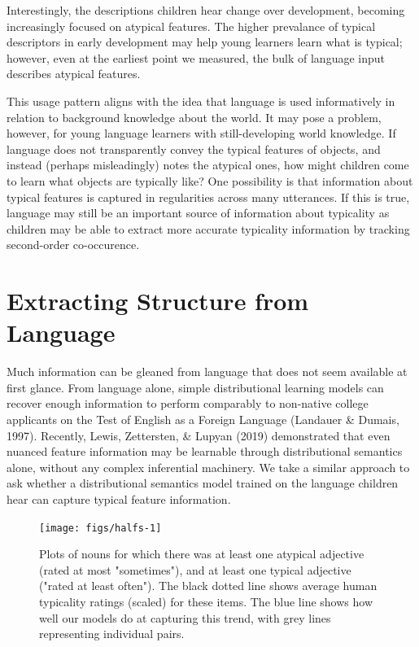 \documentclass[10pt, letterpaper]{article}
\newenvironment{CodeChunk}{}{}
\begin{document}
Interestingly, the descriptions children hear change over development,
becoming increasingly focused on atypical features. The higher
prevalance of typical descriptors in early development may help young
learners learn what is typical; however, even at the earliest point we
measured, the bulk of language input describes atypical features.

This usage pattern aligns with the idea that language is used
informatively in relation to background knowledge about the world. It
may pose a problem, however, for young language learners with
still-developing world knowledge. If language does not transparently
convey the typical features of objects, and instead (perhaps
misleadingly) notes the atypical ones, how might children come to learn
what objects are typically like? One possibility is that information
about typical features is captured in regularities across many
utterances. If this is true, language may still be an important source
of information about typicality as children may be able to extract more
accurate typicality information by tracking second-order co-occurence.

\hypertarget{extracting-structure-from-language}{%
\section{Extracting Structure from
Language}\label{extracting-structure-from-language}}

Much information can be gleaned from language that does not seem
available at first glance. From language alone, simple distributional
learning models can recover enough information to perform comparably to
non-native college applicants on the Test of English as a Foreign
Language (Landauer \& Dumais, 1997). Recently, Lewis, Zettersten, \&
Lupyan (2019) demonstrated that even nuanced feature information may be
learnable through distributional semantics alone, without any complex
inferential machinery. We take a similar approach to ask whether a
distributional semantics model trained on the language children hear can
capture typical feature information.

\begin{CodeChunk}
\begin{figure}[tb]

{\centering \texttt{[image: figs/halfs-1]} 

}

\caption[Plots of nouns for which there was at least one atypical adjective (rated at most "sometimes"), and at least one typical adjective ("rated at least often")]{Plots of nouns for which there was at least one atypical adjective (rated at most "sometimes"), and at least one typical adjective ("rated at least often"). The black dotted line shows average human typicality ratings (scaled) for these items. The blue line shows how well our models do at capturing this trend, with grey lines representing individual pairs.}\label{fig:halfs}
\end{figure}
\end{CodeChunk}
\end{document}
